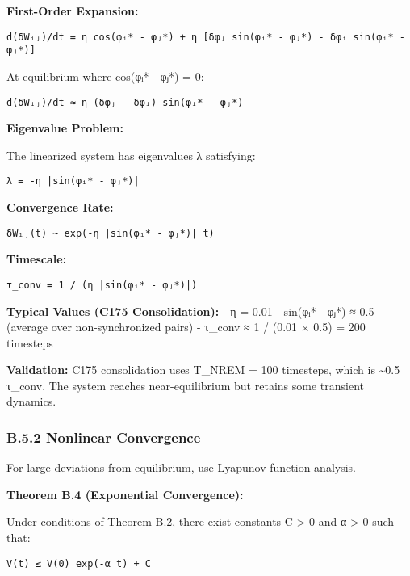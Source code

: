 \documentclass[
]{article}
\begin{document}
\textbf{First-Order Expansion:}

\begin{verbatim}
d(δWᵢⱼ)/dt = η cos(φᵢ* - φⱼ*) + η [δφⱼ sin(φᵢ* - φⱼ*) - δφᵢ sin(φᵢ* - φⱼ*)]
\end{verbatim}

At equilibrium where cos(φᵢ* - φⱼ*) = 0:

\begin{verbatim}
d(δWᵢⱼ)/dt ≈ η (δφⱼ - δφᵢ) sin(φᵢ* - φⱼ*)
\end{verbatim}

\textbf{Eigenvalue Problem:}

The linearized system has eigenvalues λ satisfying:

\begin{verbatim}
λ = -η |sin(φᵢ* - φⱼ*)|
\end{verbatim}

\textbf{Convergence Rate:}

\begin{verbatim}
δWᵢⱼ(t) ~ exp(-η |sin(φᵢ* - φⱼ*)| t)
\end{verbatim}

\textbf{Timescale:}

\begin{verbatim}
τ_conv = 1 / (η |sin(φᵢ* - φⱼ*)|)
\end{verbatim}

\textbf{Typical Values (C175 Consolidation):} - η = 0.01 -
\textbar sin(φᵢ* - φⱼ*)\textbar{} ≈ 0.5 (average over non-synchronized
pairs) - τ\_conv ≈ 1 / (0.01 × 0.5) = 200 timesteps

\textbf{Validation:} C175 consolidation uses T\_NREM = 100 timesteps,
which is \textasciitilde0.5 τ\_conv. The system reaches near-equilibrium
but retains some transient dynamics.

\subsubsection{B.5.2 Nonlinear
Convergence}\label{b.5.2-nonlinear-convergence}

For large deviations from equilibrium, use Lyapunov function analysis.

\textbf{Theorem B.4 (Exponential Convergence):}

Under conditions of Theorem B.2, there exist constants C \textgreater{}
0 and α \textgreater{} 0 such that:

\begin{verbatim}
V(t) ≤ V(0) exp(-α t) + C
\end{verbatim}
\end{document}
